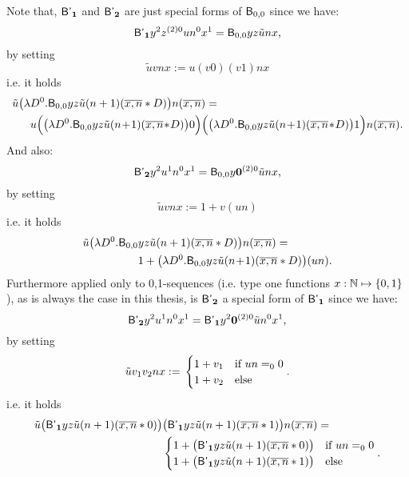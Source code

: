 \begin{rmk}Note that, $\textsf{\upshape B'}_{\mathbf1}$ and $\textsf{\upshape B'}_{\mathbf2}$ are just special
 forms of $\textsf{\upshape B}_{0,0}$ since we have:
\[
\textsf{\upshape B'}_{\mathbf1} y^2z^{(2)0}un^0x^1=\textsf{\upshape B}_{0,0}yz\tilde unx\text{,}
\]
by setting
\[
 \tilde uvnx:=u(v0)(v1)nx
\]
i.e. it holds
\begin{align*}
\tilde u\big(\lambda &D^0.\B_{0,0}yz\tilde u(n+1)(\overline{x,n}*D)\big)
         n(\overline{x,n})=\\
    &u\Big(\big(\lambda D^0.\B_{0,0}yz\tilde u(n\!+\!1)(\overline{x,n}\!*\!D)\big)0\Big)
     \Big(\big(\lambda D^0.\B_{0,0}yz\tilde u(n\!+\!1)(\overline{x,n}\!*\!D)\big)1\Big)
     n(\overline{x,n})
   \text{.}
\end{align*}
And also:
\[
\textsf{\upshape B'}_{\mathbf2} y^2u^1n^0x^1=\textsf{\upshape B}_{0,0}y\mathbf0^{(2)0}\tilde unx\text{,}
\]
by setting
\[
 \tilde uvnx:=1+v(un)
\] 
i.e. it holds
\begin{align*}
\tilde u\big(\lambda D^0.\textsf{\upshape B}_{0,0}&yz\tilde u(n+1)(\overline{x,n}*D)\big)
         n(\overline{x,n})=\\
     &1+\big(\lambda D^0.\textsf{\upshape B}_{0,0}yz\tilde u(n\!+\!1)(\overline{x,n}*D)\big)(un)
   \text{.}
\end{align*}
Furthermore applied only to 0,1-sequences (i.e. type one
functions $x:\mathbb{N}\mapsto\{0,1\}$), as is always the case in this
thesis, is $\textsf{\upshape B'}_{\mathbf2}$ a special form of $\textsf{\upshape B'}_{\mathbf1}$ since we have:
\[
\textsf{\upshape B'}_{\mathbf2} y^2u^1n^0x^1=\textsf{\upshape B'}_{\mathbf1} y^2\mathbf0^{(2)0}\tilde un^0x^1 \text{,}
\]
by setting
\[ 
\tilde uv_1v_2nx:=\\
   \begin{cases}
     1+v_1 &\text{if}\ un=_00\\
     1+v_2 &\text{else}
   \end{cases}\text{.}
\]
i.e. it holds
\begin{align*}
\tilde u\big(\textsf{\upshape B'}_{\mathbf1} yz\tilde u(n+1)(\overline{x,n}*0)\big)
        &\big(\textsf{\upshape B'}_{\mathbf1} yz\tilde u(n+1)(\overline{x,n}*1)\big)
         n(\overline{x,n})=\\
   &\begin{cases}
     1+\big(\textsf{\upshape B'}_{\mathbf1} yz\tilde u(n+1)(\overline{x,n}*0)\big) &\text{if}\ un=_00\\
     1+\big(\textsf{\upshape B'}_{\mathbf1} yz\tilde u(n+1)(\overline{x,n}*1)\big) &\text{else}
   \end{cases}\text{.}
\end{align*}\end{rmk}
%
%
%
%
